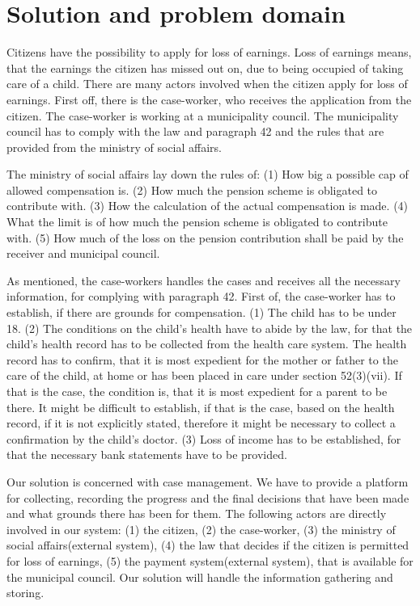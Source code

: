 \section{Solution and problem domain}
Citizens have the possibility to apply for loss of earnings. Loss of earnings means, that the earnings the citizen has missed out on, due to being occupied of taking care of a child. There are many actors involved when the citizen apply for loss of earnings. First off, there is the case-worker, who receives the application from the citizen. The case-worker is working at a municipality council. The municipality council has to comply with the law and paragraph 42 and the rules that are provided from the ministry of social affairs.

\vspace{2mm}

The ministry of social affairs lay down the rules of:
(1) How big a possible cap of allowed compensation is.
(2) How much the pension scheme is obligated to contribute with. (3) How the calculation of the actual compensation is made. (4) What the limit is of how much the pension scheme is obligated to contribute with. (5) How much of the loss on the pension contribution shall be paid by the receiver and municipal council.

\vspace{2mm}

As mentioned, the case-workers handles the cases and receives all the necessary information, for complying with paragraph 42. First of, the case-worker has to establish, if there are grounds for compensation. (1) The child has to be under 18. (2) The conditions on the child's health have to abide by the law, for that the child's health record has to be collected from the health care system. The health record has to confirm, that it is most expedient for the mother or father to the care of the child, at home or has been placed in care under section 52(3)(vii). If that is the case, the condition is, that it is most expedient for a parent to be there. It might be difficult to establish, if that is the case, based on the health record, if it is not explicitly stated, therefore it might be necessary to collect a confirmation by the child's doctor. (3) Loss of income has to be established, for that the necessary bank statements have to be provided.

\vspace{2mm}

Our solution is concerned with case management. We have to provide a platform for collecting, recording the progress and the final decisions that have been made and what grounds there has been for them. The following actors are directly involved in our system: (1) the citizen, (2) the case-worker, (3) the ministry of social affairs(external system), (4) the law that decides if the citizen is permitted for loss of earnings, (5) the payment system(external system), that is available for the municipal council. Our solution will handle the information gathering and storing.
